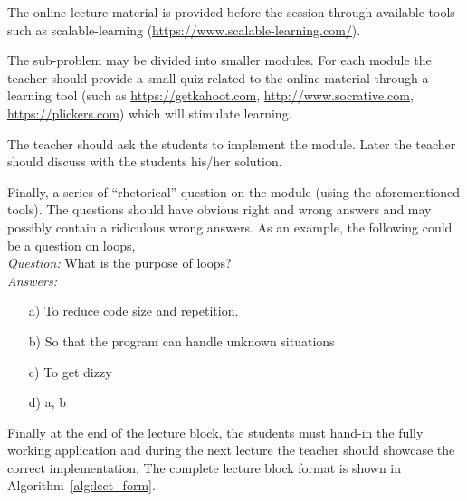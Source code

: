 \documentclass{article}
\begin{document}
The online lecture material is provided before the session through available tools such as scalable-learning (\url{https://www.scalable-learning.com/}).

The sub-problem may be divided into smaller modules. For each module the teacher should provide a small quiz related to the online material through a learning tool (such as \url{https://getkahoot.com}, \url{http://www.socrative.com}, \url{https://plickers.com}) which will stimulate learning.

The teacher should ask the students to implement the module. Later the teacher should discuss with the students his/her solution.

Finally, a series of ``rhetorical'' question on the module (using the aforementioned tools). The questions should have obvious right and wrong answers and may possibly contain a ridiculous wrong answers. As an example, the following could be a question on loops, \\[4pt]

\emph{Question:} What is the purpose of loops?\\
\emph{Answers:}
\begin{itemize}
	\item[a)] To reduce code size and repetition.
	\item[b)] So that the program can handle unknown situations
	\item[c)] To get dizzy
	\item[d)] a, b
\end{itemize}

Finally at the end of the lecture block, the students must hand-in the fully working application and during the next lecture the teacher should showcase the correct implementation. The complete lecture block format is shown in Algorithm~\ref{alg:lect_form}.

\end{document}

